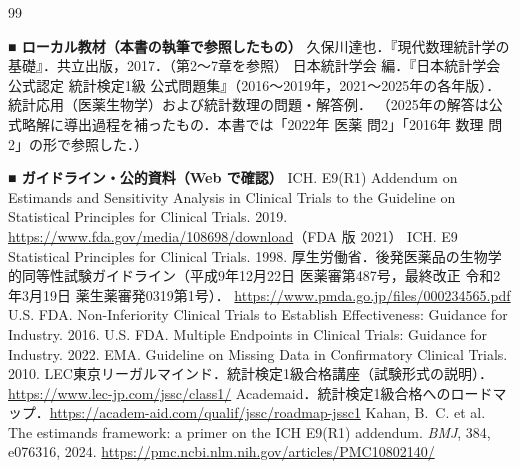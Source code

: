\backmatter
\renewcommand{\bibname}{参考文献}
\begin{thebibliography}{99}

\item[] \textbf{■ ローカル教材（本書の執筆で参照したもの）}
 久保川達也．『現代数理統計学の基礎』．共立出版，2017．（第2〜7章を参照）
 日本統計学会 編．『日本統計学会公式認定 統計検定1級 公式問題集』（2016〜2019年，2021〜2025年の各年版）．
      統計応用（医薬生物学）および統計数理の問題・解答例．
      （2025年の解答は公式略解に導出過程を補ったもの．本書では「2022年 医薬 問2」「2016年 数理 問2」の形で参照した．）

\item[] \textbf{■ ガイドライン・公的資料（Web で確認）}
 ICH. E9(R1) Addendum on Estimands and Sensitivity Analysis in Clinical Trials to the Guideline on Statistical Principles for Clinical Trials. 2019.
      \url{https://www.fda.gov/media/108698/download}（FDA 版 2021）
 ICH. E9 Statistical Principles for Clinical Trials. 1998.
 厚生労働省．後発医薬品の生物学的同等性試験ガイドライン（平成9年12月22日 医薬審第487号，最終改正 令和2年3月19日 薬生薬審発0319第1号）．
      \url{https://www.pmda.go.jp/files/000234565.pdf}
 U.S. FDA. Non-Inferiority Clinical Trials to Establish Effectiveness: Guidance for Industry. 2016.
 U.S. FDA. Multiple Endpoints in Clinical Trials: Guidance for Industry. 2022.
 EMA. Guideline on Missing Data in Confirmatory Clinical Trials. 2010.
 LEC東京リーガルマインド．統計検定1級合格講座（試験形式の説明）．\url{https://www.lec-jp.com/jssc/class1/}
 Academaid．統計検定1級合格へのロードマップ．\url{https://academ-aid.com/qualif/jssc/roadmap-jssc1}
 Kahan, B.~C. et al. The estimands framework: a primer on the ICH E9(R1) addendum. \textit{BMJ}, 384, e076316, 2024.
      \url{https://pmc.ncbi.nlm.nih.gov/articles/PMC10802140/}


\end{thebibliography}
